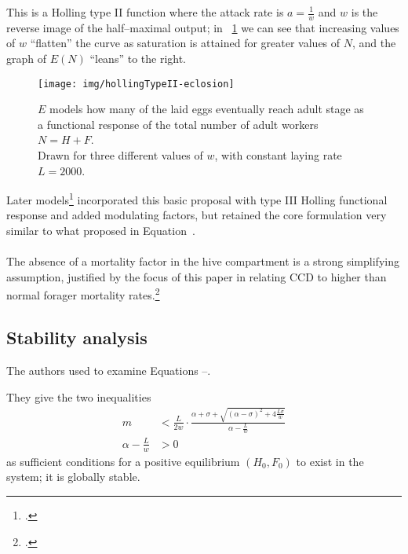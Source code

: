 This is a Holling type II function where the attack rate is $a=\frac{1}{w}$ and $w$ is the reverse image of the half--maximal output; in \figurename~\ref{img:eclos} we can see that increasing values of $w$ ``flatten'' the curve
as saturation is attained for greater values of $N$, and the graph of $E(N)$ ``leans'' to the right.

\begin{figure}[pbh]
    \centering
    \texttt{[image: img/hollingTypeII-eclosion]}

    \caption[Holling type II Eclosion]{$E$ models how many of the laid eggs eventually reach adult stage as a functional response of the total number of adult workers $N=H+F$.
    \\
    Drawn for three different values of $w$, with constant laying rate $L=2000$.}
    \label{img:eclos}
\end{figure}

Later models\footcite{ratti2017} incorporated this basic proposal with type III Holling functional response and added modulating factors, but retained the core formulation very similar to what     \citeauthor{khoury2011} proposed in Equation~.

\paragraph{}
The absence of a mortality factor in the hive compartment  is a strong simplifying assumption,
justified by the focus of this paper in relating CCD to higher than normal forager mortality rates.\footcite[1,2,3,5]{khoury2011}

\subsection{Stability analysis}
The authors used  to examine Equations --.

They give the two inequalities
\begin{align}
    m &< \frac{L}{2w} \cdot \frac{\alpha + \sigma + \sqrt{{(\alpha - \sigma)}^2
            + 4 \frac{L \sigma}{w} } }{\alpha - \frac{L}{w}}
    \label{eq:posEq1} \\
    \alpha - \frac{L}{w} &> 0 \label{eq:posEq2}
\end{align}
as sufficient conditions for a positive equilibrium $(H_0, F_0)$ to exist in the system; it is globally stable.


